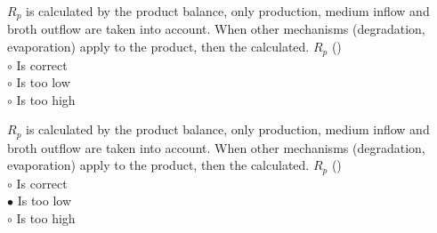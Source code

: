 \documentclass[]{beamer}
\begin{document}
\begin{frame}[shrink] {}
\addtocounter{questions}{1}
\color{blue}
$R_p$ is calculated by the product balance, only production, medium inflow and broth outflow are taken into account.
When other mechanisms (degradation, evaporation) apply to the product, then the calculated. $R_p$ ()\\
\color{black}
\setlength{\parindent}{-0.4cm}
{\color{red}$\circ$} Is correct\\
{\color{red}$\circ$} Is too low \\
{\color{red}$\circ$} Is too high \\
\end{frame}
\begin{frame}[shrink] {}
\addtocounter{answers}{1}
\color{blue}
$R_p$ is calculated by the product balance, only production, medium inflow and broth outflow are taken into account.
When other mechanisms (degradation, evaporation) apply to the product, then the calculated. $R_p$ ()\\
\color{black}
\setlength{\parindent}{-0.4cm}
{\color{red}$\circ$} Is correct\\
{\color{red}$\bullet$} Is too low \\
{\color{red}$\circ$} Is too high \\
\end{frame}
\end{document}
